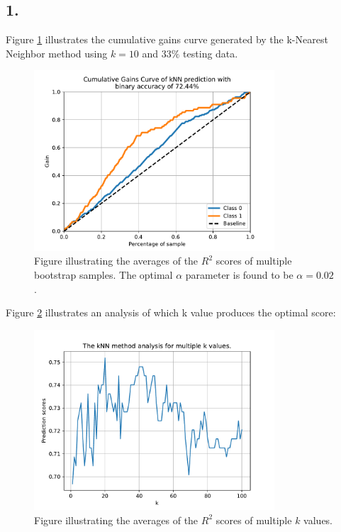 \documentclass[]{article}
\begin{document}
\subsection*{1.}
Figure \ref{fig:cumgains_kNN} illustrates the cumulative gains curve generated by the k-Nearest Neighbor method using $k=10$ and $33\%$ testing data.
\begin{figure}[H]
	\centering
	\includegraphics[width=0.8\textwidth]{figures/kNN_E2P1.pdf}
	\caption{Figure illustrating the averages of the $R^2$ scores of multiple bootstrap samples. The optimal $\alpha$ parameter is found to be $\alpha=0.02$.}
	\label{fig:cumgains_kNN}
\end{figure}
Figure \ref{fig:kNN_k} illustrates an analysis of which k value produces the optimal score:
\begin{figure}[H]
	\centering
	\includegraphics[width=0.8\textwidth]{figures/E1P2_kNN.pdf}
	\caption{Figure illustrating the averages of the $R^2$ scores of multiple $k$ values.}
	\label{fig:kNN_k}
\end{figure}
\end{document}
